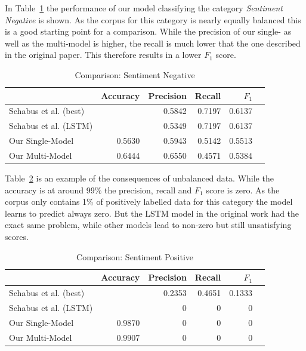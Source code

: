 \documentclass[11pt,a4paper]{article}
\begin{document}
In Table~\ref{tab:results:sentiment_negative} the performance of our model classifying the category \textit{Sentiment Negative} is shown. As the corpus for this category is nearly equally balanced this is a good starting point for a comparison. While the precision of our single- as well as the multi-model is higher, the recall is much lower that the one described in the original paper. This therefore results in a lower $F_1$ score.
\begin{table}[h!]
	\centering\scriptsize
	\begin{tabular}{l r r r r r}
		& Accuracy & Precision & Recall & $F_1$ \\
		\hline
		Schabus et al. (best) & & 0.5842 & 0.7197 & 0.6137 \\
		Schabus et al. (LSTM) & & 0.5349 & 0.7197 & 0.6137 \\
		\hline
		Our Single-Model & 0.5630 & 0.5943 & 0.5142 & 0.5513\\
		Our Multi-Model & 0.6444 & 0.6550 & 0.4571 & 0.5384 \\
	\end{tabular}  
	\caption{Comparison: Sentiment Negative}
	\label{tab:results:sentiment_negative}
\end{table}

Table~\ref{tab:results:sentiment_positive} is an example of the consequences of unbalanced data. While the accuracy is at around 99\% the precision, recall and $F_1$ score is zero. As the corpus only contains 1\% of positively labelled data for this category the model learns to predict always zero.
But the LSTM model in the original work had the exact same problem, while other models lead to non-zero but still unsatisfying scores.
\begin{table}[h!]
	\centering\scriptsize
	\begin{tabular}{l r r r r r}
		& Accuracy & Precision & Recall & $F_1$ \\
		\hline
		Schabus et al. (best) & & 0.2353 & 0.4651 & 0.1333 \\
		Schabus et al. (LSTM) & & 0 & 0 & 0\\
		\hline
		Our Single-Model & 0.9870 & 0 & 0 & 0 \\
		Our Multi-Model & 0.9907 & 0 & 0 & 0 \\
	\end{tabular}
	\caption{Comparison: Sentiment Positive}
	\label{tab:results:sentiment_positive}
\end{table}
\end{document}
